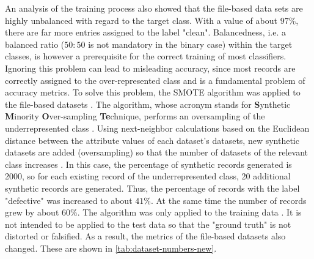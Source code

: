 An analysis of the training process also showed that the file-based data sets are highly unbalanced with regard to the target class. With a value of about $97\%$, there are far more entries assigned to the label "clean". Balancedness, i.e. a balanced ratio ($50:50$ is not mandatory in the binary case) within the target classes, is however a prerequisite for the correct training of most classifiers. Ignoring this problem can lead to misleading accuracy, since most records are correctly assigned to the over-represented class and is a fundamental problem of accuracy metrics. To solve this problem, the SMOTE algorithm was applied to the file-based datasets \cite{Chawla2002}. The algorithm, whose acronym stands for \textbf{S}ynthetic \textbf{M}inority \textbf{O}ver-sampling \textbf{Te}chnique, performs an oversampling of the underrepresented class \cite{Chawla2002}. Using next-neighbor calculations based on the Euclidean distance between the attribute values of each dataset's datasets, new synthetic datasets are added (oversampling) so that the number of datasets of the relevant class increases \cite{Chawla2002}. In this case, the percentage of synthetic records generated is 2000, so for each existing record of the underrepresented class, 20 additional synthetic records are generated. Thus, the percentage of records with the label "defective" was increased to about $41\%$. At the same time the number of records grew by about $60\%$. The algorithm was only applied to the training data \cite{Chawla2002} . It is not intended to be applied to the test data so that the "ground truth" is not distorted or falsified. As a result, the metrics of the file-based datasets also changed. These are shown in \autoref{tab:dataset-numbers-new}.

